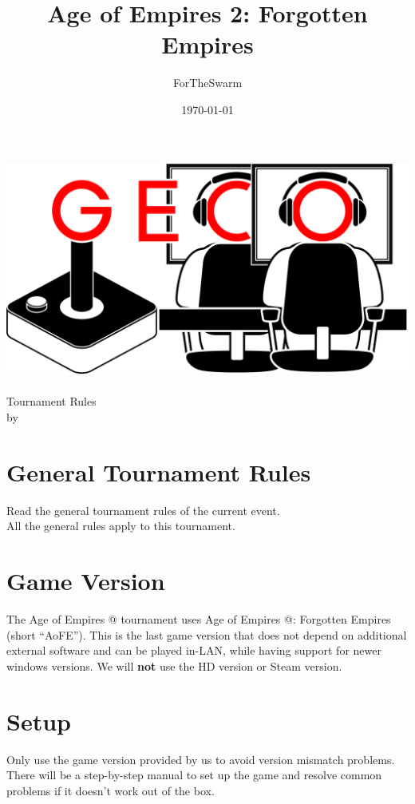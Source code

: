 \documentclass{article}
\title{Age of Empires 2: Forgotten Empires}
\author{ForTheSwarm}
\date{\today}
\makeatletter
\newcommand*{\rom}[1]{\expandafter\@slowromancap\romannumeral #1@}
\makeatother
\begin{document}
\makeatletter
\begin{titlepage}
\centering
\includegraphics[scale=0.075]{../img/GECo.png}\\
\vspace{1.2cm}
\LARGE \@title\\ Tournament Rules\\ \normalsize by \@author\\ \@date
\end{titlepage}
\makeatother


\clearpage

\tableofcontents
\clearpage

\section{General Tournament Rules}
Read the general tournament rules of the current event.\\
All the general rules apply to this tournament.

\section{Game Version}
The Age of Empires \rom{2} tournament uses Age of Empires \rom{2}: Forgotten Empires (short ``AoFE''). This is the last game version that does not depend on additional external software and can be played in-LAN, while having support for newer windows versions. We will \textbf{not} use the HD version or Steam version.

\section{Setup}
Only use the game version provided by us to avoid version mismatch problems. There will be a step-by-step manual to set up the game and resolve common problems if it doesn't work out of the box.
\end{document}
